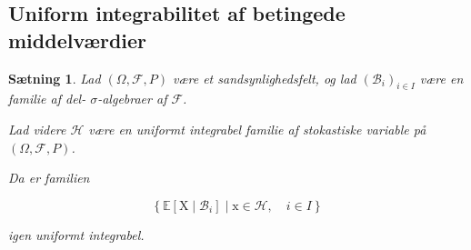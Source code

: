 \documentclass{article}
\newcommand{\1}{\mathbbm{1}}
\theoremstyle{boxed}
\newtheorem{proposition}[theorem]{Sætning}
\begin{document}
\subsection{Uniform integrabilitet af betingede middelværdier}
\begin{theorem-box}
    \begin{proposition}
        Lad $(\Omega, \mathcal{F}, P)$ være et sandsynlighedsfelt, og lad $\left(\mathcal{B}_i\right)_{i \in I}$ være en familie af del- $\sigma$-algebraer af $\mathcal{F}$.

Lad videre $\mathcal{H}$ være en uniformt integrabel familie af stokastiske variable på $(\Omega, \mathcal{F}, P)$.

Da er familien

$$
\left\{\mathbb{E}\left[\mathrm{X} \mid \mathcal{B}_i\right] \mid \mathrm{x} \in \mathcal{H}, \quad i \in I\right\}
$$

igen uniformt integrabel.
    \end{proposition}
\end{theorem-box}
\end{document}
